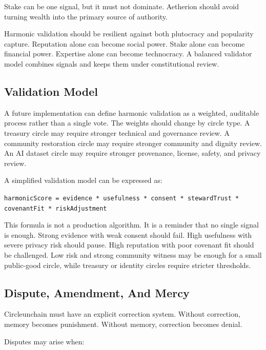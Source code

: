 \documentclass[12pt]{article}
\begin{document}
Stake can be one signal, but it must not dominate. Aetherion should avoid turning wealth into the primary source of authority.

Harmonic validation should be resilient against both plutocracy and popularity capture. Reputation alone can become social power. Stake alone can become financial power. Expertise alone can become technocracy. A balanced validator model combines signals and keeps them under constitutional review.

\subsection{Validation Model}

A future implementation can define harmonic validation as a weighted, auditable process rather than a single vote. The weights should change by circle type. A treasury circle may require stronger technical and governance review. A community restoration circle may require stronger community and dignity review. An AI dataset circle may require stronger provenance, license, safety, and privacy review.

A simplified validation model can be expressed as:

\begin{center}
\texttt{harmonicScore = evidence * usefulness * consent * stewardTrust * covenantFit * riskAdjustment}
\end{center}

This formula is not a production algorithm. It is a reminder that no single signal is enough. Strong evidence with weak consent should fail. High usefulness with severe privacy risk should pause. High reputation with poor covenant fit should be challenged. Low risk and strong community witness may be enough for a small public-good circle, while treasury or identity circles require stricter thresholds.

\subsection{Dispute, Amendment, And Mercy}

Circleunchain must have an explicit correction system. Without correction, memory becomes punishment. Without memory, correction becomes denial.

Disputes may arise when:
\end{document}
